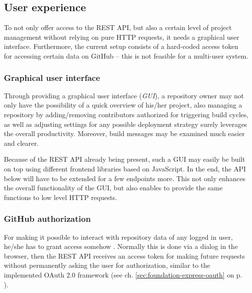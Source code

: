 \subsection{User experience}
\label{sec:outlook-userexperience}

To not only offer access to the REST API, but also a certain level of project management without relying on pure HTTP requests, it needs a graphical user interface. Furthermore, the current setup consists of a hard-coded access token for accessing certain data on GitHub -- this is not feasible for a multi-user system.

\subsubsection{Graphical user interface}
Through providing a graphical user interface (\emph{GUI}), a repository owner may not only have the possibility of a quick overview of his/her project, also managing a repository by adding/removing contributors authorized for triggering build cycles, as well as adjusting settings for any possible deployment strategy surely leverages the overall productivity. Moreover, build messages may be examined much easier and clearer.

Because of the REST API already being present, such a GUI may easily be built on top using different frontend libraries based on JavaScript. In the end, the API below will have to be extended for a few endpoints more. This not only enhances the overall functionality of the GUI, but also enables to provide the same functions to low level HTTP requests.

\subsubsection{GitHub authorization}
For making it possible to interact with repository data of any logged in user, he/she has to grant access somehow \cite{GithubAuthentication}. Normally this is done via a dialog in the browser, then the REST API receives an access token for making future requests without permanently asking the user for authorization, similar to the implemented OAuth 2.0 framework (see ch. \ref{sec:foundation-express-oauth} on p. \pageref{sec:foundation-express-oauth}).
